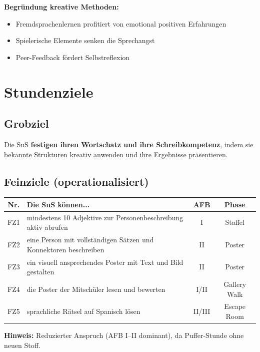 \documentclass[11pt,a4paper]{article}
\begin{document}
\textbf{Begründung kreative Methoden:}
\begin{itemize}
    \item Fremdsprachenlernen profitiert von emotional positiven Erfahrungen
    \item Spielerische Elemente senken die Sprechangst
    \item Peer-Feedback fördert Selbstreflexion
\end{itemize}

\section{Stundenziele}

\subsection{Grobziel}
Die SuS \textbf{festigen ihren Wortschatz und ihre Schreibkompetenz}, indem sie bekannte Strukturen kreativ anwenden und ihre Ergebnisse präsentieren.

\subsection{Feinziele (operationalisiert)}

\begin{tabular}{|c|p{6.5cm}|c|c|}
\hline
\textbf{Nr.} & \textbf{Die SuS können...} & \textbf{AFB} & \textbf{Phase} \\
\hline
FZ1 & mindestens 10 Adjektive zur Personenbeschreibung aktiv abrufen & I & Staffel \\
\hline
FZ2 & eine Person mit vollständigen Sätzen und Konnektoren beschreiben & II & Poster \\
\hline
FZ3 & ein visuell ansprechendes Poster mit Text und Bild gestalten & II & Poster \\
\hline
FZ4 & die Poster der Mitschüler lesen und bewerten & I/II & Gallery Walk \\
\hline
FZ5 & sprachliche Rätsel auf Spanisch lösen & II/III & Escape Room \\
\hline
\end{tabular}

\vspace{1em}
\textbf{Hinweis:} Reduzierter Anspruch (AFB I--II dominant), da Puffer-Stunde ohne neuen Stoff.
\end{document}
